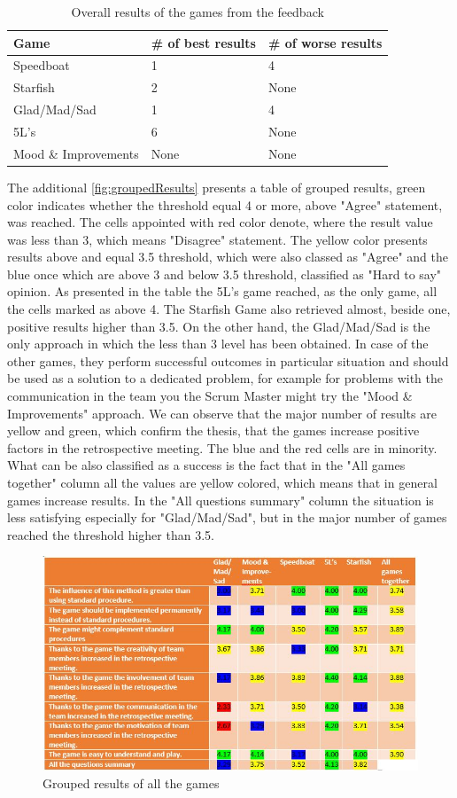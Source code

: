 \begin{table}[!htbp]
	\caption{Overall results of the games from the feedback}
	\label{tab:groups-overallConclusion}
	\begin{tabularx}{\textwidth}{|X|X|X|}
	\hline
		Game & \# of best results & \# of worse results\\ \hline
		Speedboat & 1 & 4 \\ \hline
		Starfish & 2 & None \\ \hline
        Glad/Mad/Sad & 1 & 4 \\ \hline
        5L's & 6 & None \\ \hline
        Mood \& Improvements & None & None\\ \hline
	\end{tabularx}
\end{table}

The additional \autoref{fig:groupedResults} presents a table of grouped results, green color indicates whether the threshold equal 4 or more, above "Agree" statement, was reached. The cells appointed with red color denote, where the result value was less than 3, which means "Disagree" statement. The yellow color presents results above and equal 3.5 threshold, which were also classed as "Agree" and the blue once which are above 3 and below 3.5 threshold, classified as "Hard to say" opinion. As presented in the table the 5L's game reached, as the only game, all the cells marked as above 4. The Starfish Game also retrieved almost, beside one, positive results higher than 3.5. On the other hand, the Glad/Mad/Sad is the only approach in which the less than 3 level has been obtained. In case of the other games, they perform successful outcomes in particular situation and should be used as a solution to a dedicated problem, for example for problems with the communication in the team you the Scrum Master might try the "Mood \& Improvements" approach. We can observe that the major number of results are yellow and green, which confirm the thesis, that the games increase positive factors in the retrospective meeting. The blue and the red cells are in minority. What can be also classified as a success is the fact that in the "All games together" column all the values are yellow colored, which means that in general games increase results. In the "All questions summary" column the situation is less satisfying especially for "Glad/Mad/Sad", but in the major number of games reached the threshold higher than 3.5.


\begin{figure}[!htbp]
\caption{Grouped results of all the games}
\label{fig:groupedResults}
\centering
\includegraphics[width=1\textwidth]{charts/groupedResults}
\end{figure}